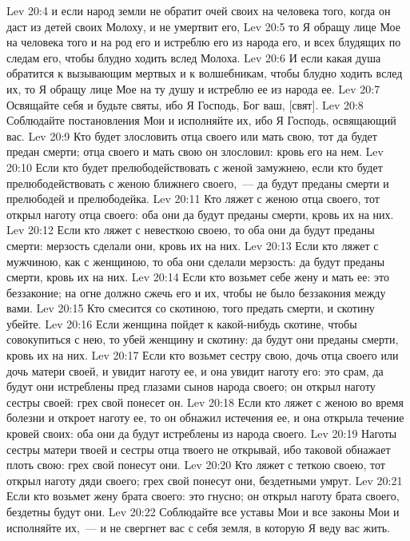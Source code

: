 \vs Lev 20:4 и если народ земли не обратит очей своих на человека того, когда он даст из детей своих Молоху, и не умертвит его,
\vs Lev 20:5 то Я обращу лице Мое на человека того и на род его и истреблю его из народа его, и всех блудящих по следам его, чтобы блудно ходить вслед Молоха.
\vs Lev 20:6 И если какая душа обратится к вызывающим мертвых и к волшебникам, чтобы блудно ходить вслед их, то Я обращу лице Мое на ту душу и истреблю ее из народа ее.
\vs Lev 20:7 Освящайте себя и будьте святы, ибо Я Господь, Бог ваш, [свят].
\vs Lev 20:8 Соблюдайте постановления Мои и исполняйте их, ибо Я Господь, освящающий вас.
\vs Lev 20:9 Кто будет злословить отца своего или мать свою, тот да будет предан смерти; отца своего и мать свою он злословил: кровь его на нем.
\vs Lev 20:10 Если кто будет прелюбодействовать с женой замужнею, если кто будет прелюбодействовать с женою ближнего своего,~--- да будут преданы смерти и прелюбодей и прелюбодейка.
\vs Lev 20:11 Кто ляжет с женою отца своего, тот открыл наготу отца своего: оба они да будут преданы смерти, кровь их на них.
\vs Lev 20:12 Если кто ляжет с невесткою своею, то оба они да будут преданы смерти: мерзость сделали они, кровь их на них.
\vs Lev 20:13 Если кто ляжет с мужчиною, как с женщиною, то оба они сделали мерзость: да будут преданы смерти, кровь их на них.
\vs Lev 20:14 Если кто возьмет себе жену и мать ее: это беззаконие; на огне должно сжечь его и их, чтобы не было беззакония между вами.
\vs Lev 20:15 Кто смесится со скотиною, того предать смерти, и скотину убейте.
\vs Lev 20:16 Если женщина пойдет к какой-нибудь скотине, чтобы совокупиться с нею, то убей женщину и скотину: да будут они преданы смерти, кровь их на них.
\vs Lev 20:17 Если кто возьмет сестру свою, дочь отца своего или дочь матери своей, и увидит наготу ее, и она увидит наготу его: это срам, да будут они истреблены пред глазами сынов народа своего; он открыл наготу сестры своей: грех свой понесет он.
\vs Lev 20:18 Если кто ляжет с женою во время болезни  и откроет наготу ее, то он обнажил истечения ее, и она открыла течение кровей своих: оба они да будут истреблены из народа своего.
\vs Lev 20:19 Наготы сестры матери твоей и сестры отца твоего не открывай, ибо таковой обнажает плоть свою: грех свой понесут они.
\vs Lev 20:20 Кто ляжет с теткою своею, тот открыл наготу дяди своего; грех свой понесут они, бездетными умрут.
\vs Lev 20:21 Если кто возьмет жену брата своего: это гнусно; он открыл наготу брата своего, бездетны будут они.
\rsbpar\vs Lev 20:22 Соблюдайте все уставы Мои и все законы Мои и исполняйте их,~--- и не свергнет вас с себя земля, в которую Я веду вас жить.

